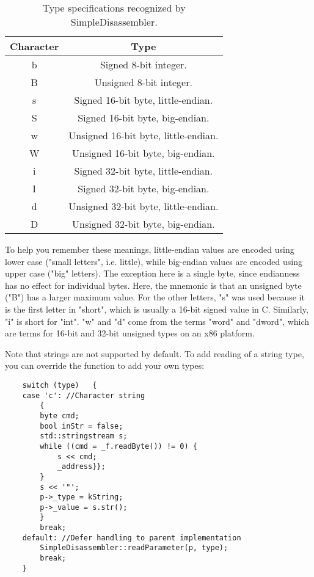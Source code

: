 \begin{table}[!hpbt]
\centering
\begin{tabular}{c | c}
Character & Type \\
\hline
b & Signed 8-bit integer. \\
B & Unsigned 8-bit integer. \\
s & Signed 16-bit byte, little-endian. \\
S & Signed 16-bit byte, big-endian. \\
w & Unsigned 16-bit byte, little-endian. \\
W & Unsigned 16-bit byte, big-endian. \\
i & Signed 32-bit byte, little-endian. \\
I & Signed 32-bit byte, big-endian. \\
d & Unsigned 32-bit byte, little-endian. \\
D & Unsigned 32-bit byte, big-endian. \\
\end{tabular}
\caption{Type specifications recognized by SimpleDisassembler.}
\label{tbl:paramtypes}
\end{table}

To help you remember these meanings, little-endian values are encoded using lower case ("small letters", i.e. little), while big-endian values are encoded using upper case ("big" letters). The exception here is a single byte, since endianness has no effect for individual bytes. Here, the mnemonic is that an unsigned byte ("B") has a larger maximum value. For the other letters, "s" was used because it is the first letter in "short", which is usually a 16-bit signed value in C. Similarly, "i" is short for "int". "w" and "d" come from the terms "word" and "dword", which are terms for 16-bit and 32-bit unsigned types on an x86 platform.

Note that strings are not supported by default. To add reading of a string type, you can override the  function to add your own types:

\begin{C++}
\begin{lstlisting}
	switch (type)	{
	case 'c': //Character string
		{
		byte cmd;
		bool inStr = false;
		std::stringstream s;
		while ((cmd = _f.readByte()) != 0) {
			s << cmd;
			_address}};
		}
		s << '"';
		p->_type = kString;
		p->_value = s.str();
		}
		break;
	default: //Defer handling to parent implementation
		SimpleDisassembler::readParameter(p, type);
		break;
	}
\end{lstlisting}
\end{C++}

